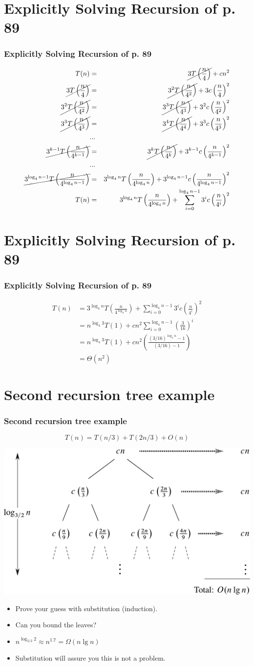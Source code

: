 \documentclass{beamer}
\newcommand{\sect}[1]{
\section{#1}
\begin{frame}[fragile]\frametitle{#1}
}
\newcommand{\bi}{\begin{itemize}}
\newcommand{\ii}{\item}
\newcommand{\ei}{\end{itemize}}
\begin{document}
\sect{Explicitly Solving Recursion of p. 89}
\begin{eqnarray*}
T(n) &=& \cancel{3T\left(\frac{n}{4}\right)}+ cn^2\\
\cancel{3T\left(\frac{n}{4}\right)} &=& \cancel{3^2T\left(\frac{n}{4^2}\right) } + 3c\left(\frac{n}{4}\right)^2\\
\cancel{3^2T\left(\frac{n}{4^2}\right)} &=& \cancel{3^3T\left(\frac{n}{4^3}\right)}  + 3^2c\left(\frac{n}{4^2}\right)^2\\
\cancel{3^3T\left(\frac{n}{4^3}\right)} &=& \cancel{3^4T\left(\frac{n}{4^4}\right)}  + 3^3c\left(\frac{n}{4^3}\right)^2\\
&...&\\
\cancel{3^{k-1}T\left(\frac{n}{4^{k-1}}\right)} &=& \cancel{3^{k}T\left(\frac{n}{4^{k}}\right)}  + 3^{k-1}c\left(\frac{n}{4^{k-1}}\right)^2\\
&...&\\
\cancel{3^{\log_4 n-1}T\left(\frac{n}{4^{\log_4 n-1}}\right)} &=& 3^{\log_4 n}T\left(\frac{n}{4^{\log_4 n}}\right)  + 3^{\log_4 n-1}c\left(\frac{n}{4^{\log_4 n-1}}\right)^2\\
T(n) &=&3^{\log_4 n}T\left(\frac{n}{4^{\log_4 n}}\right)  + \sum_{i=0}^{\log_4 n-1}3^{i}c\left(\frac{n}{4^{i}}\right)^2\\
\end{eqnarray*}
\end{frame}

\sect{Explicitly Solving Recursion of p. 89}
\begin{align*}
  T(n) &=
  3^{\log_4 n}T\left(\frac{n}{4^{\log_4 n}}\right)
  + \sum_{i=0}^{\log_4 n-1}3^{i}c\left(\frac{n}{4^{i}}\right)^2\\
  &=   n^{\log_4 3}T(1)
  + cn^2\sum_{i=0}^{\log_4 n-1}\left(\frac{3}{16}\right)^i\\
  &=
     n^{\log_4 3}T(1)
     + cn^2\left(\frac{(3/16)^{\log_4 n} - 1}{(3/16)-1}\right)\\
 &= \Theta(n^2)
     \end{align*}


\end{frame}


\sect{Second recursion tree example}
\footnotesize
\[ T(n) = T(n/3) + T(2n/3) + O(n) \]
\vfill

\includegraphics[scale=0.1]{Fig-4-6.pdf}
\bi
\pause
\ii Prove your guess with substitution (induction).
\pause
\ii Can you bound the leaves?
\pause
\ii $n^{\log_{3/2} 2} \approx n^{1.7} =\Omega(n\lg n)$
\pause
\ii Substitution will assure you this is not a problem.
\ei

\end{frame}
\end{document}
